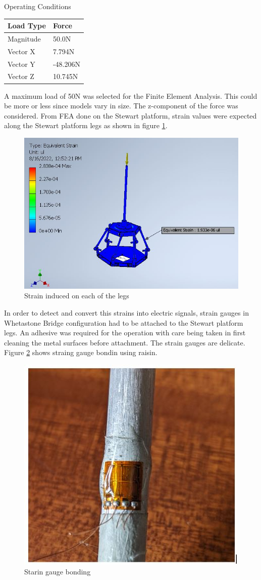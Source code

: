 \begin{center}
	\begin{table}[H]
	\caption{Operating Conditions}
	\centering
	\label{tableop}
	\end{table}
	\begin{tabular}{|l|l|}
	\hline
	\textbf{Load Type} & \textbf{Force}\\
	\hline
	Magnitude & 50.0N\\
	\hline
	Vector X & 7.794N\\
	\hline
	Vector Y & -48.206N\\
	\hline
	Vector Z & 10.745N\\
	\hline
	\end{tabular}
	\end{center}
A maximum load of 50N was selected for the Finite Element Analysis.
This could be more or less since models vary in size. The z-component of the force was considered.
From FEA done on the Stewart platform, 
strain values were expected along the Stewart platform legs as shown in figure \ref{eq}.
\begin{center}
	\begin{figure}[H]
	\centering
	\includegraphics[width=0.6\linewidth]{Figures/Equivalent}
	\caption[Equivalent strain]{Strain induced on each of the legs}
	\label{eq}
	\end{figure}
\end{center}
In order to detect and convert this strains into electric signals, strain gauges in Whetastone Bridge configuration
had to be attached to the Stewart platform legs. An adhesive was required for the operation with care being
taken in first cleaning the metal surfaces before attachment. The strain gauges are delicate. Figure \ref{bon}
shows straing gauge bondin using raisin.
\begin{center}
	\begin{figure}[H]
	\centering
	\includegraphics[width=0.5\linewidth]{Figures/Strain gauge bonding.JPG}
	\caption[Bonding]{Starin gauge bonding}
	\label{bon}
	\end{figure}
\end{center}
